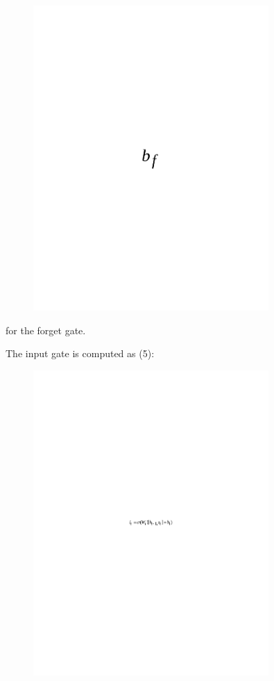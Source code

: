 \begin{figure}[H]
	\centering
	\includegraphics[width=0.8\textwidth]{media/ict/image51}
	\caption*{}
\end{figure}

for the forget gate.

The input gate is computed as (5):

\begin{figure}[H]
	\centering
	\includegraphics[width=0.8\textwidth]{media/ict/image52}
	\caption*{}
\end{figure}


